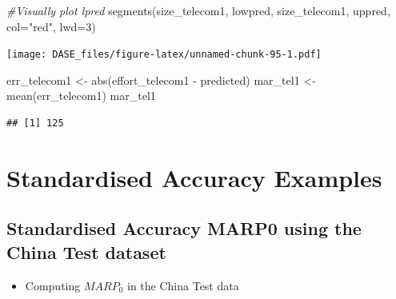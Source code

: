 \documentclass[
]{book}
\newenvironment{Shaded}{\begin{snugshade}}{\end{snugshade}}
\newcommand{\AttributeTok}[1]{\textcolor[rgb]{0.77,0.63,0.00}{#1}}
\newcommand{\CommentTok}[1]{\textcolor[rgb]{0.56,0.35,0.01}{\textit{#1}}}
\newcommand{\DecValTok}[1]{\textcolor[rgb]{0.00,0.00,0.81}{#1}}
\newcommand{\FunctionTok}[1]{\textcolor[rgb]{0.00,0.00,0.00}{#1}}
\newcommand{\NormalTok}[1]{#1}
\newcommand{\OtherTok}[1]{\textcolor[rgb]{0.56,0.35,0.01}{#1}}
\newcommand{\SpecialCharTok}[1]{\textcolor[rgb]{0.00,0.00,0.00}{#1}}
\newcommand{\StringTok}[1]{\textcolor[rgb]{0.31,0.60,0.02}{#1}}
\providecommand{\tightlist}{%
  \setlength{\itemsep}{0pt}\setlength{\parskip}{0pt}}
\begin{document}
\begin{Shaded}
\begin{Highlighting}[]
\CommentTok{\#Visually plot lpred}
\FunctionTok{segments}\NormalTok{(size\_telecom1, lowpred, size\_telecom1, uppred, }\AttributeTok{col=}\StringTok{"red"}\NormalTok{, }\AttributeTok{lwd=}\DecValTok{3}\NormalTok{)}
\end{Highlighting}
\end{Shaded}

\texttt{[image: DASE\_files/figure-latex/unnamed-chunk-95-1.pdf]}

\begin{Shaded}
\begin{Highlighting}[]
\NormalTok{err\_telecom1 }\OtherTok{\textless{}{-}} \FunctionTok{abs}\NormalTok{(effort\_telecom1 }\SpecialCharTok{{-}}\NormalTok{ predicted)}
\NormalTok{mar\_tel1 }\OtherTok{\textless{}{-}} \FunctionTok{mean}\NormalTok{(err\_telecom1)}
\NormalTok{mar\_tel1}
\end{Highlighting}
\end{Shaded}

\begin{verbatim}
## [1] 125
\end{verbatim}

\hypertarget{standardised-accuracy-examples}{%
\section{Standardised Accuracy Examples}\label{standardised-accuracy-examples}}

\hypertarget{standardised-accuracy-marp0-using-the-china-test-dataset}{%
\subsection{Standardised Accuracy MARP0 using the China Test dataset}\label{standardised-accuracy-marp0-using-the-china-test-dataset}}

\begin{itemize}
\tightlist
\item
  Computing \(MARP_0\) in the China Test data
\end{itemize}
\end{document}
